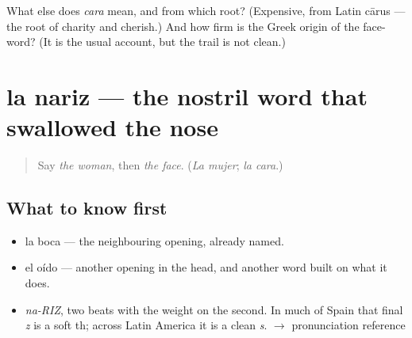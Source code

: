 \begin{tcolorbox}[breakable,colback=teal!4,colframe=teal!35!black,title={Before you move on}]
What else does \emph{cara} mean, and from which root? (Expensive, from Latin cārus — the root of charity and cherish.) And how firm is the Greek origin of the face-word? (It is the usual account, but the trail is not clean.)
\end{tcolorbox}
\section[la nariz]{la nariz — the nostril word that swallowed the nose}

\label{lesson:ES-C364-nariz}



\begin{quote}
Say \emph{the woman}, then \emph{the face}. (\emph{La mujer}; \emph{la cara}.)
\end{quote}

\subsection*{What to know first}
\begin{itemize}
\raggedright
  \item la boca — the neighbouring opening, already named.
  \item el oído — another opening in the head, and another word built on what it does.
\end{itemize}

\begin{sounds}
\begin{itemize}
\raggedright
  \item \emph{na-RIZ}, two beats with the weight on the second. In much of Spain that final \emph{z} is a soft th; across Latin America it is a clean \emph{s}. $\to$ pronunciation reference
\end{itemize}
\end{sounds}


